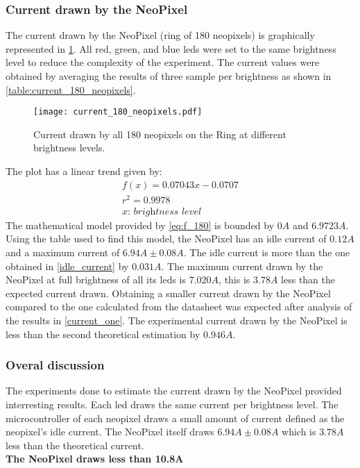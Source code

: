 \subsubsection{Current drawn by the NeoPixel}
The current drawn by the NeoPixel (ring of 180 neopixels) is graphically represented in \cref{fig:current_180_neopixels}. All red, green, and blue leds were set to the same brightness level to reduce the complexity of the experiment. The current values were obtained by averaging the results of three sample per brightness as shown in \cref{table:current_180_neopixels}. 
\begin{figure}[ht]
	\centering
	\texttt{[image: current\_180\_neopixels.pdf]}
	\caption{Current drawn by all 180 neopixels on the Ring at different brightness levels.}
	\label{fig:current_180_neopixels}
\end{figure}
The plot has a linear trend given by:
\begin{equation}
\label{eq:f_180}
\begin{multlined}
f(x) = 0.07043x-0.0707 \\
r^2 = 0.9978\\
\textit{$x$: brightness level}
\end{multlined}
\end{equation} 
The mathematical model provided by \cref{eq:f_180} is bounded by $0A$ and $6.9723A$. Using the table used to find this model, the NeoPixel has an idle current of $0.12A$ and a maximum current of $6.94A \pm 0.08 A$. The idle current is more than the one obtained in \cref{idle_current} by $0.031A$. The maximum current drawn by the NeoPixel at full brightness of all its leds is $7.020A$, this is $3.78A$ less than the expected current drawn. Obtaining a smaller current drawn by the NeoPixel compared to the one calculated from the datasheet  was expected after analysis of the results in \cref{current_one}. The experimental current drawn by the NeoPixel is less than the second theoretical estimation by $0.946A$.
 
\subsubsection{Overal discussion}
The experiments done to estimate the current drawn by the NeoPixel provided interresting results. Each led draws the same current per brightness level. The microcontroller of each neopixel draws a small amount of current defined as the neopixel's idle current. The NeoPixel itself draws $6.94A \pm 0.08 A$ which is $3.78A$ less than the theoretical current.\\
\textbf{The NeoPixel draws less than 10.8A}


